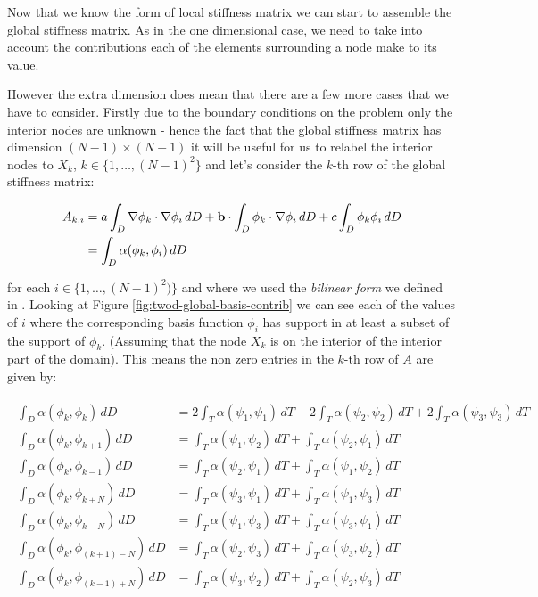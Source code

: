 Now that we know the form of local stiffness matrix
 we can start to assemble the global stiffness
matrix. As in the one dimensional case, we need to take into account the
contributions each of the elements surrounding a node make to its value.

However the extra dimension does mean that there are a few more cases that we
have to consider. Firstly due to the boundary conditions on the problem only
the interior nodes are unknown - hence the fact that the global stiffness
matrix has dimension $(N - 1) \times (N - 1)$ it will be useful for us to
relabel the interior nodes to $X_k$, $k \in \{1, \ldots, (N-1)^2\}$ and let's
consider the $k$-th row of the global stiffness matrix:

\begin{align}
  \begin{split}
    A_{k,i} &= a\int_D\nabla\phi_k\cdot\nabla\phi_i\, dD
            + \mathbf{b} \cdot \int_D\phi_k\cdot\nabla\phi_i\, dD
            + c\int_D\phi_k\phi_i\, dD \\
            &= \int_D\alpha(\phi_k,\phi_i)\, dD
  \end{split}
\end{align}

for each $i \in \{1,\ldots,(N-1)^2)\}$ and where we used the \textit{bilinear
form} we defined in . Looking at Figure
\ref{fig:twod-global-basis-contrib} we can see each of the values of $i$ where
the corresponding basis function $\phi_i$ has support in at least a subset of
the support of $\phi_k$. (Assuming that the node $X_k$ is on the interior of
the interior part of the domain).  This means the non zero entries in the
$k$-th row of $A$ are given by:

\begin{align}
  \begin{split}
      \int_D\alpha(\phi_k,\phi_k)\, dD
        &= 2\int_T\alpha(\psi_1,\psi_1)\, dT + 2\int_T\alpha(\psi_2,\psi_2)\, dT
         + 2\int_T\alpha(\psi_3,\psi_3)\, dT \\
      \int_D\alpha(\phi_k,\phi_{k+1})\, dD
          &= \int_T\alpha(\psi_1,\psi_2)\, dT + \int_T\alpha(\psi_2,\psi_1)\, dT \\
      \int_D\alpha(\phi_k,\phi_{k-1})\, dD
          &= \int_T\alpha(\psi_2,\psi_1)\, dT + \int_T\alpha(\psi_1,\psi_2)\, dT \\
      \int_D\alpha(\phi_k,\phi_{k+N})\, dD
          &= \int_T\alpha(\psi_3,\psi_1)\, dT + \int_T\alpha(\psi_1,\psi_3)\, dT \\
      \int_D\alpha(\phi_k,\phi_{k-N})\, dD
          &= \int_T\alpha(\psi_1,\psi_3)\, dT + \int_T\alpha(\psi_3,\psi_1)\, dT \\
      \int_D\alpha(\phi_k,\phi_{(k+1) - N})\, dD
          &= \int_T\alpha(\psi_2,\psi_3)\, dT + \int_T\alpha(\psi_3,\psi_2)\, dT \\
      \int_D\alpha(\phi_k,\phi_{(k-1) + N})\, dD
          &= \int_T\alpha(\psi_3,\psi_2)\, dT + \int_T\alpha(\psi_2,\psi_3)\, dT
  \end{split}
\end{align}

